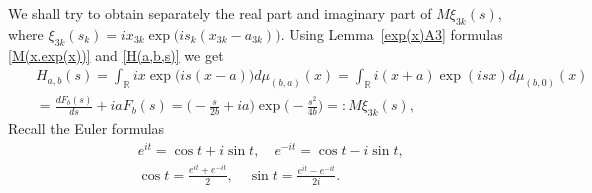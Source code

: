 \documentclass[preprint,12pt]{elsarticle}
\numberwithin{equation}{section}
\begin{document}
\begin{pf}
We shall try 
to obtain separately the real part and imaginary part of $ M\xi_{3k}(s)$, where
$\xi_{3k}(s_k)=ix_{3k}\exp\big(is_k(x_{3k}-a_{3k})\big)$.
Using Lemma~\ref{exp(x)A3}
formulas \eqref{M(x.exp(x))} and \eqref{H(a,b,s)}  we get
\begin{eqnarray*}
\nonumber
&&
H_{a,b}(s)=\int_{\mathbb R}ix\exp\big(is(x-a)\big)d\mu_{(b,a)}(x)=\int_{\mathbb R}i(x+a)\exp(isx)d\mu_{(b,0)}(x)\\
&&=\frac{dF_b(s)}{ds}+iaF_b(s)=\Big(-\frac{s}{2b}+ia\Big)\exp\Big(-\frac{s^2}{4b}\Big)=:M\xi_{3k}(s),
\end{eqnarray*}
Recall the Euler formulas
\begin{eqnarray}
 \label{Euler}
&&
e^{it}=\cos t+i\sin t,\quad  e^{-it}=\cos t-i\sin t,\\
\nonumber
&&
\cos t=\frac{e^{it}+e^{-it}}{2},\quad
\sin t=\frac{e^{it}-e^{-it}}{2i}.
\end{eqnarray}


\end{pf}
\end{document}

